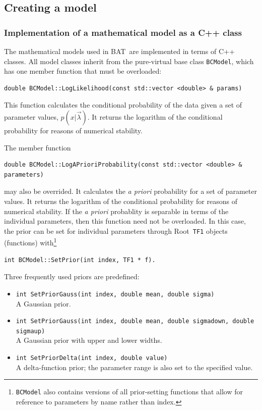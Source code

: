 \documentclass[11pt, a4paper]{article}
\newcommand{\bat}{{\sc BAT}}
\newcommand{\Root}{{\sc Root}}
\newcommand{\code}[1]{\texttt{#1}}
\begin{document}

\subsection{Creating a model}
\label{subsection:model}


\subsubsection{Implementation of a mathematical model as a C++ class}
\label{subsubsection:implementation}

The mathematical models used in \bat\ are implemented in terms of C++
classes. All model classes inherit from the pure-virtual base class
\verb|BCModel|, which has one member function that must be overloaded:
%
\begin{verbatim}
double BCModel::LogLikelihood(const std::vector <double> & params)
\end{verbatim}
%
This function calculates the conditional probability of the data given
a set of parameter values, $p(x|\vec{\lambda})$. It returns the
logarithm of the conditional probability for reasons of numerical
stability.
%

The member function
%
\begin{verbatim}
double BCModel::LogAPrioriProbability(const std::vector <double> & parameters)
\end{verbatim}
%
may also be overrided. It calculates the {\it a priori} probability
for a set of parameter values. It returns the logarithm of the
conditional probability for reasons of numerical stability. If the
{\it a priori} probablity is separable in terms of the individual
parameters, then this function need not be overloaded.  In this case,
the prior can be set for individual parameters through \Root\
\verb|TF1| objects (functions) with\footnote{\code{BCModel} also
  contains versions of all prior-setting functions that allow for
  reference to parameters by name rather than index.}
%
\begin{verbatim}
int BCModel::SetPrior(int index, TF1 * f).
\end{verbatim}
%
Three frequently used priors are predefined:
%
\begin{itemize}
\item \code{int SetPriorGauss(int index, double mean, double sigma)}\\
  A Gaussian prior.

\item \code{int SetPriorGauss(int index, double mean, double sigmadown, double sigmaup)}\\
  A Gaussian prior with upper and lower widths.

\item \code{int SetPriorDelta(int index, double value)}\\
  A delta-function prior; the parameter range is also set to the
  specified value.
\end{itemize}
\end{document}

